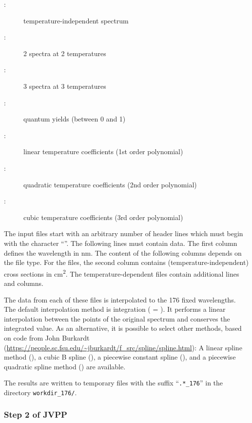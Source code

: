 \documentclass[a4paper,twoside]{article}
\newcommand{\IT}[1]{#1\index{#1}}
\begin{document}
\begin{description}
\item [:] temperature-independent spectrum
\item [:] 2 spectra at 2 temperatures
\item [:] 3 spectra at 3 temperatures
\item [:] quantum yields (between 0 and 1)
\item [:] linear temperature coefficients (1st order
  polynomial)
\item [:] quadratic temperature coefficients (2nd order
  polynomial)
\item [:] cubic temperature coefficients (3rd order
  polynomial)
\end{description}

The input files start with an arbitrary number of header lines which
must begin with the character ``\code{#}''. The following lines must
contain data. The first column defines the wavelength in \unit{nm}. The
content of the following columns depends on the file type. For the
 files, the second column contains (temperature-independent)
cross sections in \unit{cm^2}. The temperature-dependent files contain
additional lines and columns.

The data from each of these files is interpolated to the 176 fixed
wavelengths. The default interpolation method is integration
( = ). It performs a linear
interpolation between the points of the original spectrum and conserves
the integrated value. As an alternative, it is possible to select other
methods, based on code from John Burkardt
(\url{https://people.sc.fsu.edu/~jburkardt/f_src/spline/spline.html}): A
linear spline method (), a cubic B spline
(), a piecewise constant spline (), and a
piecewise quadratic spline method () are available.

The results are written to temporary files with the suffix
``\verb|.*_176|'' in the directory \verb|workdir_176/|.

\subsubsection{Step 2 of \IT{JVPP}}
\end{document}
